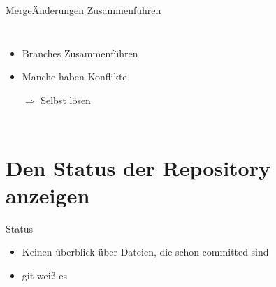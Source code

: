 \documentclass[xcolor=dvipsnames]{beamer}
\begin{document}
    \begin{frame}{Merge}{Änderungen Zusammenführen}
      \begin{columns}
          \begin{itemize}[<+->]
            \item Branches Zusammenführen
            \item Manche haben Konflikte
            \item[$\Rightarrow$] Selbst lösen
          \end{itemize}
      \end{columns}
    \end{frame}

  \section[Status]{Den Status der Repository anzeigen}

    \begin{frame}{Status}
          \begin{itemize}[<+->]
            \item Keinen überblick über Dateien, die schon committed sind
            \item git weiß es
          \end{itemize}
    \end{frame}
\end{document}
